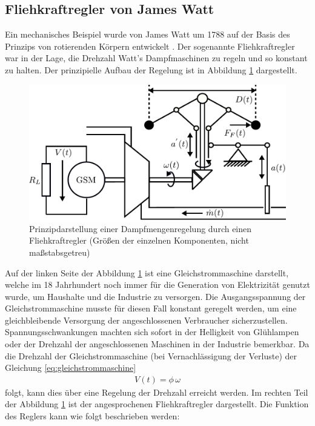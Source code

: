 \subsection{Fliehkraftregler von James Watt}
%
Ein mechanisches Beispiel wurde von James Watt um 1788 auf der Basis des Prinzips von rotierenden Körpern entwickelt \cite{Unbehauen08}. Der sogenannte Fliehkraftregler war in der Lage, die Drehzahl Watt's Dampfmaschinen zu regeln und so konstant zu halten. Der prinzipielle Aufbau der Regelung ist in Abbildung \ref{fig:fliehkraftregler} dargestellt.
%
\begin{figure}[h]
	\centering
	\includegraphics[width=0.83\linewidth]{Abbildungen/Grundbegriffe/PDF/HystorischeSystemeFliehkraft.pdf}
	\caption{Prinzipdarstellung einer Dampfmengenregelung durch einen Fliehkraftregler (Größen der einzelnen Komponenten, nicht maßstabsgetreu)}
	\label{fig:fliehkraftregler}
\end{figure}
%
Auf der linken Seite der Abbildung \ref{fig:fliehkraftregler} ist eine Gleichstrommaschine darstellt, welche im 18 Jahrhundert noch immer für die Generation von Elektrizität genutzt wurde, um Haushalte und die Industrie zu versorgen. Die Ausgangsspannung der Gleichstrommaschine musste für diesen Fall konstant geregelt werden, um eine gleichbleibende Versorgung der angeschlossenen Verbraucher sicherzustellen. Spannungsschwankungen machten sich sofort in der Helligkeit von Glühlampen oder der Drehzahl der angeschlossenen Maschinen in der Industrie bemerkbar. Da die Drehzahl der Gleichstrommaschine (bei Vernachlässigung der Verluste) der Gleichung \ref{eq:gleichstrommaschine}
%
\begin{align}
	V(t) = \phi\,\omega \label{eq:gleichstrommaschine}
\end{align}
%
folgt, kann dies über eine Regelung der Drehzahl erreicht werden. Im rechten Teil der Abbildung \ref{fig:fliehkraftregler} ist der angesprochenen Fliehkraftregler dargestellt. Die Funktion des Reglers kann wie folgt beschrieben werden:

